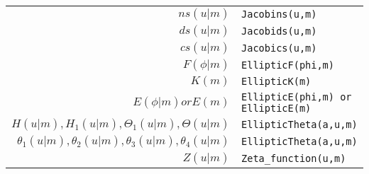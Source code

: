 {\begin{tabular}{r l}
$ns(u|m)$ & {\tt Jacobins(u,m)}\\
$ds(u|m)$ & {\tt Jacobids(u,m)}\\
$cs(u|m)$ & {\tt Jacobics(u,m)}\\
$F(\phi|m)$ & {\tt EllipticF(phi,m)}\\
$K(m)$ & {\tt EllipticK(m)}\\
$E(\phi|m) or E(m)$ & {\tt EllipticE(phi,m) or EllipticE(m)}\\
$H(u|m), H_1(u|m), \Theta_1(u|m), \Theta(u|m)$ & {\tt EllipticTheta(a,u,m)}\\
$\theta_1(u|m), \theta_2(u|m), \theta_3(u|m), \theta_4(u|m)$
   & {\tt EllipticTheta(a,u,m)}\\
$Z(u|m)$ & {\tt Zeta\_function(u,m)}
\end{tabular}}







